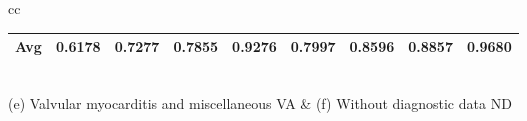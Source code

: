 \begin{table}[t!]
\begin{center}
\begin{tabular}{cc}
{\begin{footnotesize}
\begin{tabular}{|c|cccc|cccc|}
Avg & 0.6178 & 0.7277 & \textbf{0.7855} & 0.9276 & 0.7997  & 0.8596 & \textbf{0.8857} & 0.9680 \\

\hline
\end{tabular}
\label{incart_results}
\end{footnotesize}
}
\\
(e) Valvular myocarditis and miscellaneous VA & (f) Without diagnostic data ND \\
\end{tabular}
\label{ptbdb_grouped}

\end{center}
\end{table}



